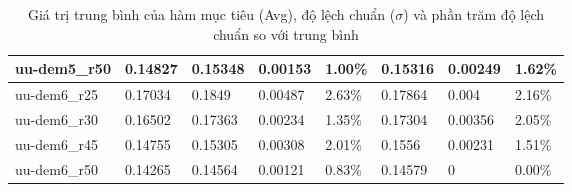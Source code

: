 \begin{table}[H]
\begin{tabular}{|l|l|l|l|l|l|l|l|}
    uu-dem5\_r50                                & 0.14827                                  & 0.15348                  & 0.00153                    & 1.00\%                  & 0.15316                  & 0.00249                    & 1.62\%                  \\ \hline
    uu-dem6\_r25                                & 0.17034                                  & 0.1849                   & 0.00487                    & 2.63\%                  & 0.17864                  & 0.004                      & 2.16\%                  \\ \hline
    uu-dem6\_r30                                & 0.16502                                  & 0.17363                  & 0.00234                    & 1.35\%                  & 0.17304                  & 0.00356                    & 2.05\%                  \\ \hline
    uu-dem6\_r45                                & 0.14755                                  & 0.15305                  & 0.00308                    & 2.01\%                  & 0.1556                   & 0.00231                    & 1.51\%                  \\ \hline
    uu-dem6\_r50                                & 0.14265                                  & 0.14564                  & 0.00121                    & 0.83\%                  & 0.14579                  & 0                          & 0.00\%                  \\ \hline
    \end{tabular}
    \caption{Giá trị trung bình của hàm mục tiêu (Avg), độ lệch chuẩn ($\sigma$) và phần trăm độ lệch chuẩn so với trung bình}
    \label{result_compare}
\end{table}
